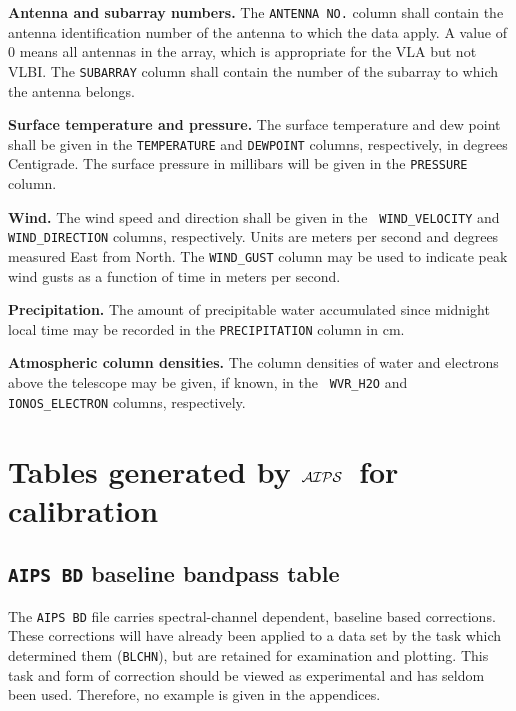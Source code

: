 \documentclass[twoside]{article}
\newcommand{\Hi}[1]{\textcolor{hicol}{#1}}
\newcommand{\AIPS}{{$\cal AIPS\/$}}
\begin{document}
{\bf Antenna and subarray numbers.}  The {\tt ANTENNA NO.} column
shall contain the antenna identification number of the antenna to
which the data apply.  A value of 0 means all antennas in the array,
which is appropriate for the VLA but not VLBI\@.  The {\tt SUBARRAY}
column shall contain the number of the subarray to which the antenna
belongs.

{\bf Surface temperature and pressure.} The surface temperature and
dew point shall be given in the {\tt TEMPERATURE} and {\tt DEWPOINT}
columns, respectively, in degrees Centigrade.  The surface pressure in
millibars will be given in the {\tt PRESSURE} column.

{\bf Wind.} The wind speed and direction shall be given in the {\tt
  WIND\_VELOCITY} and {\tt WIND\_DIRECTION} columns, respectively.
Units are meters per second and degrees measured East from North.
\Hi{The {\tt WIND\_GUST} column may be used to indicate peak wind
  gusts as a function of time in meters per second.}

\Hi{{\bf Precipitation.} The amount of precipitable water accumulated
  since midnight local time may be recorded in the {\tt PRECIPITATION}
  column in cm.}

{\bf Atmospheric column densities.} The column densities of water and
electrons above the telescope \Hi{may} be given, if known, in the {\tt
  WVR\_H2O} and {\tt IONOS\_ELECTRON} columns, respectively.

\vfill\eject
\section{Tables generated by \AIPS\ for calibration}
\label{s:calibration}

\subsection{{\tt AIPS BD} baseline bandpass table}
\label{s:BD}

The {\tt AIPS BD} file carries spectral-channel dependent, baseline
based corrections.  These corrections will have already been applied
to a data set by the task which determined them ({\tt BLCHN}), but are
retained for examination and plotting.  This task and form of
correction should be viewed as experimental and has seldom been used.
Therefore, no example is given in the appendices.
\end{document}
